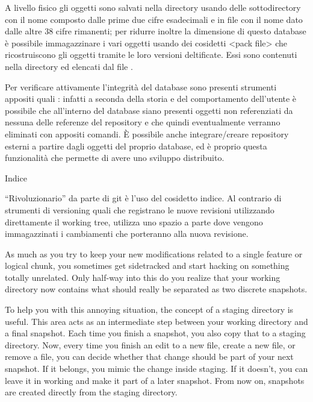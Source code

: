 A livello fisico gli oggetti sono salvati nella directory 
usando delle sottodirectory con il nome composto dalle prime due cifre
esadecimali e in file con il nome dato dalle altre 38 cifre rimanenti;
per ridurre inoltre la dimensione di questo database \`e
possibile immagazzinare i vari oggetti usando dei cosidetti \evidenzia<pack
file> che ricostruiscono gli oggetti tramite le loro versioni deltificate. Essi
sono contenuti nella directory  ed elencati dal file
. 

Per verificare attivamente l'integrit\`a del database sono presenti strumenti
appositi quali : infatti a seconda della storia e del
comportamento dell'utente \`e possibile che all'interno del database siano
presenti oggetti non referenziati da nessuna delle referenze del repository e
che quindi eventualmente verranno eliminati con appositi comandi. \`E possibile
anche integrare/creare repository esterni a partire dagli oggetti del proprio
database, ed \`e proprio questa funzionalit\`a che permette di avere uno
sviluppo distribuito.

\sezione Indice

``Rivoluzionario'' da parte di git \`e l'uso del cosidetto indice. Al contrario
di strumenti di versioning quali  che registrano le nuove revisioni
utilizzando direttamente il working tree,  utilizza uno spazio a parte
dove vengono immagazzinati i cambiamenti che porteranno alla nuova revisione.

As much as you try to keep your new modifications related to a single feature or logical chunk, you sometimes get sidetracked and start hacking on something totally unrelated. Only half-way into this do you realize that your working directory now contains what should really be separated as two discrete snapshots.

To help you with this annoying situation, the concept of a staging directory is useful. This area acts as an intermediate step between your working directory and a final snapshot. Each time you finish a snapshot, you also copy that to a staging directory. Now, every time you finish an edit to a new file, create a new file, or remove a file, you can decide whether that change should be part of your next snapshot. If it belongs, you mimic the change inside staging. If it doesn’t, you can leave it in working and make it part of a later snapshot. From now on, snapshots are created directly from the staging directory.

